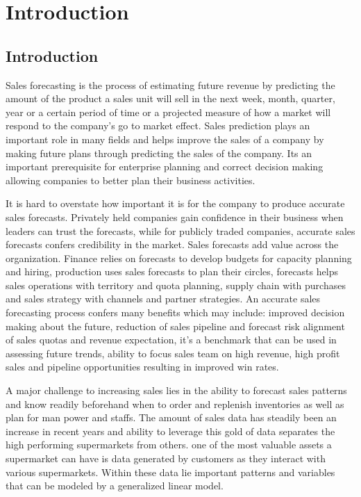 
\chapter{Introduction} 
\label{Chapter1} 
\section{Introduction}
Sales forecasting is the process of estimating future revenue by predicting the amount of the product a sales unit will sell in the next week, month, quarter, year or a certain period of time or a projected measure of how a market will respond to the company’s go to market effect. Sales prediction plays an important role in many fields and helps improve the sales of a company by making future plans through predicting the sales of the company. Its an important prerequisite for enterprise planning and correct decision making allowing companies to better plan their business activities.

It is hard to overstate how important it is for the company to produce accurate sales forecasts. Privately held companies gain confidence in their business when leaders can trust the forecasts, while for publicly traded companies, accurate sales forecasts confers credibility in the market. Sales forecasts add value across the organization. Finance relies on forecasts to develop budgets for capacity planning and hiring, production uses sales forecasts to plan their circles, forecasts helps sales operations with territory and quota planning, supply chain with purchases and sales strategy with channels and partner strategies. An accurate sales forecasting process confers many benefits which may include: improved decision making about the future, reduction of sales pipeline and forecast risk alignment of sales quotas and revenue expectation, it’s a benchmark that can be used in assessing future trends, ability to focus sales team on high revenue, high profit sales and pipeline opportunities
resulting in improved win rates.

A major challenge to increasing sales lies in the ability to forecast sales patterns and know readily beforehand when to order and replenish inventories as well as plan for man power and staffs. The amount of sales data has steadily been an increase in recent years and ability to leverage this gold of data separates the high performing supermarkets from others. one of the most valuable assets a supermarket can have is data generated by customers as they interact with various supermarkets. Within these data lie important patterns and variables that can be modeled by a generalized linear model.

